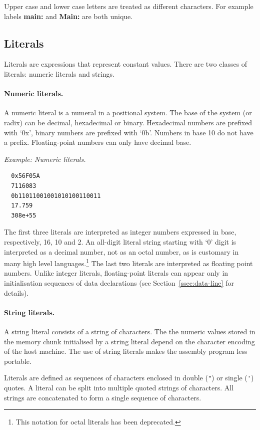 \documentclass[a4paper,twoside]{tceusermanual}
\begin{document}
Upper case and lower case letters are treated as different characters.
For example labels \textbf{main:} and \textbf{Main:} are both unique.

\subsection{Literals}
\label{ssec:literals}

Literals are expressions that represent constant values. There are two
classes of literals: numeric literals and strings.

\paragraph{Numeric literals.}

A numeric literal is a numeral in a positional system. The base of the
system (or radix) can be decimal, hexadecimal or binary. Hexadecimal numbers
are prefixed with `0x', binary numbers are prefixed with `0b'. Numbers in
base 10 do not have a prefix. Floating-point numbers can only have decimal
base.

\emph{Example: Numeric literals.}
%
\begin{verbatim}
  0x56F05A
  7116083
  0b11011001001010100110011
  17.759
  308e+55
\end{verbatim}
The first three literals are interpreted as integer numbers expressed in
base, respectively, 16, 10 and 2. An all-digit literal string starting with
`0' digit is interpreted as a decimal number, not as an octal number, as is
customary in many high level languages.\footnote{
%
  This notation for octal literals has been deprecated.}
%
The last two literals are interpreted as floating point numbers. Unlike
integer literals, floating-point literals can appear only in initialisation
sequences of data declarations (see Section~\ref{ssec:data-line} for
details).

\paragraph{String literals.}

A string literal consists of a string of characters. The the numeric values
stored in the memory chunk initialised by a string literal depend on the
character encoding of the host machine.
%
%
The use of string literals makes the assembly program less portable.

Literals are defined as sequences of characters enclosed in double
(\verb|"|) or single (\verb|'|) quotes. A literal can be split into multiple
quoted strings of characters. All strings are concatenated to form a single
sequence of characters.
\end{document}
